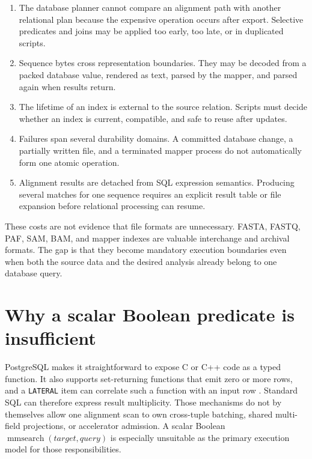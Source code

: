 \begin{enumerate}
  \item The database planner cannot compare an alignment path with another
  relational plan because the expensive operation occurs after export.
  Selective predicates and joins may be applied too early, too late, or in
  duplicated scripts.

  \item Sequence bytes cross representation boundaries.  They may be
  decoded from a packed database value, rendered as text, parsed by the
  mapper, and parsed again when results return.

  \item The lifetime of an index is external to the source relation.
  Scripts must decide whether an index is current, compatible, and safe to
  reuse after updates.

  \item Failures span several durability domains.  A committed database
  change, a partially written file, and a terminated mapper process do not
  automatically form one atomic operation.

  \item Alignment results are detached from SQL expression semantics.
  Producing several matches for one sequence requires an explicit result
  table or file expansion before relational processing can resume.
\end{enumerate}

These costs are not evidence that file formats are unnecessary.  FASTA,
FASTQ, PAF, SAM, BAM, and mapper indexes are valuable interchange and
archival formats.  The gap is that they become mandatory execution
boundaries even when both the source data and the desired analysis already
belong to one database query.

\section{Why a scalar Boolean predicate is insufficient}
\label{sec:scalar-function-gap}

PostgreSQL makes it straightforward to expose C or C++ code as a typed
function.  It also supports set-returning functions that emit zero or more
rows, and a \texttt{LATERAL} item can correlate such a function with an input
row \cite{postgresql17_set_returning_functions,postgresql17_sql_functions}.
Standard SQL can
therefore express result multiplicity.  Those mechanisms do not by themselves
allow one alignment scan to own cross-tuple batching, shared
multi-field projections, or accelerator admission.  A scalar Boolean
\(\operatorname{mmsearch}(target, query)\) is especially unsuitable as the
primary execution model for those responsibilities.

